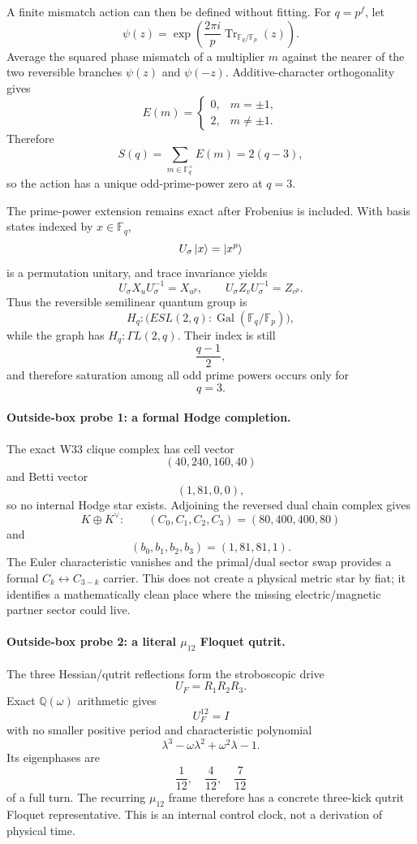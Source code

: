 A finite mismatch action can then be defined without fitting.  For
$q=p^f$, let
\[
\psi(z)=
\exp\!\left(
\frac{2\pi i}{p}
\operatorname{Tr}_{\mathbb F_q/\mathbb F_p}(z)
\right).
\]
Average the squared phase mismatch of a multiplier $m$ against the nearer of
the two reversible branches $\psi(z)$ and $\psi(-z)$.  Additive-character
orthogonality gives
\[
E(m)=
\begin{cases}
0,&m=\pm1,\\
2,&m\ne\pm1.
\end{cases}
\]
Therefore
\[
\boxed{
S(q)=\sum_{m\in\mathbb F_q^\times}E(m)=2(q-3),
}
\]
so the action has a unique odd-prime-power zero at $q=3$.

The prime-power extension remains exact after Frobenius is included.  With
basis states indexed by $x\in\mathbb F_q$,
\[
U_\sigma\left|x\right\rangle=\left|x^p\right\rangle
\]
is a permutation unitary, and trace invariance yields
\[
U_\sigma X_uU_\sigma^{-1}=X_{u^p},
\qquad
U_\sigma Z_vU_\sigma^{-1}=Z_{v^p}.
\]
Thus the reversible semilinear quantum group is
\[
H_q:
\bigl(
ESL(2,q):\operatorname{Gal}(\mathbb F_q/\mathbb F_p)
\bigr),
\]
while the graph has $H_q:\Gamma L(2,q)$.  Their index is still
\[
\boxed{\frac{q-1}{2}},
\]
and therefore saturation among all odd prime powers occurs only for
\[
\boxed{q=3.}
\]

\paragraph{Outside-box probe 1: a formal Hodge completion.}
The exact W33 clique complex has cell vector
\[
(40,240,160,40)
\]
and Betti vector
\[
(1,81,0,0),
\]
so no internal Hodge star exists.  Adjoining the reversed dual chain complex
gives
\[
K\oplus K^\vee:
\qquad
(C_0,C_1,C_2,C_3)=(80,400,400,80)
\]
and
\[
(b_0,b_1,b_2,b_3)=(1,81,81,1).
\]
The Euler characteristic vanishes and the primal/dual sector swap provides a
formal $C_k\leftrightarrow C_{3-k}$ carrier.  This does not create a physical
metric star by fiat; it identifies a mathematically clean place where the
missing electric/magnetic partner sector could live.

\paragraph{Outside-box probe 2: a literal $\mu_{12}$ Floquet qutrit.}
The three Hessian/qutrit reflections form the stroboscopic drive
\[
U_F=R_1R_2R_3.
\]
Exact $\mathbb Q(\omega)$ arithmetic gives
\[
U_F^{12}=I
\]
with no smaller positive period and characteristic polynomial
\[
\boxed{
\lambda^3-\omega\lambda^2+\omega^2\lambda-1.
}
\]
Its eigenphases are
\[
\boxed{
\frac1{12},\quad\frac4{12},\quad\frac7{12}
}
\]
of a full turn.  The recurring $\mu_{12}$ frame therefore has a concrete
three-kick qutrit Floquet representative.  This is an internal control clock,
not a derivation of physical time.

